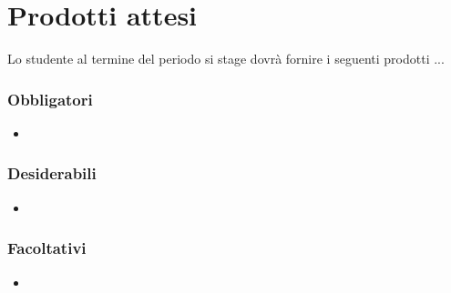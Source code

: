 
\section{Prodotti attesi}
	Lo studente al termine del periodo si stage dovrà fornire i seguenti prodotti ...
	\subsubsection*{Obbligatori}
	\begin{itemize}
		\item 
	\end{itemize}
	
	\subsubsection*{Desiderabili}
	\begin{itemize}
		\item 
	\end{itemize}
	
	\subsubsection*{Facoltativi}
	\begin{itemize}
		\item
	\end{itemize} 
